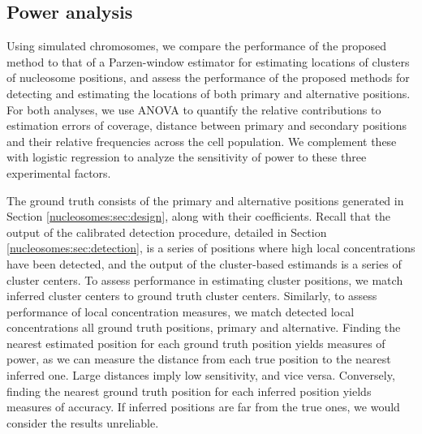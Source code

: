 \subsection{Power analysis}
\label{nucleosomes:sec:power}

Using simulated chromosomes, we compare the performance of the proposed method to that of a Parzen-window estimator for estimating locations of clusters of nucleosome positions, and assess the performance of the proposed methods for detecting and estimating the locations of both primary and alternative positions.
For both analyses, we use ANOVA to quantify the relative contributions to estimation errors of coverage, distance between primary and secondary positions and their relative frequencies across the cell population.
We complement these with logistic regression to analyze the sensitivity of power to these three experimental factors.

The ground truth consists of the primary and alternative positions generated in Section \ref{nucleosomes:sec:design}, along with their coefficients.
Recall that the output of the calibrated detection procedure, detailed in Section \ref{nucleosomes:sec:detection}, is a series of positions where high local concentrations have been detected, and the output of  the cluster-based estimands is a series of cluster centers.
%
%
To assess performance in estimating cluster positions, we match inferred cluster centers to ground truth cluster centers.
Similarly, to assess performance of local concentration measures, we match detected local concentrations all ground truth positions, primary and alternative.
%
Finding the nearest estimated position for each ground truth position yields measures of power, as we can measure the distance from each true position to the nearest inferred one.
Large distances imply low sensitivity, and vice versa.
Conversely, finding the nearest ground truth position for each inferred position yields measures of accuracy.
If inferred positions are far from the true ones, we would consider the results unreliable.


